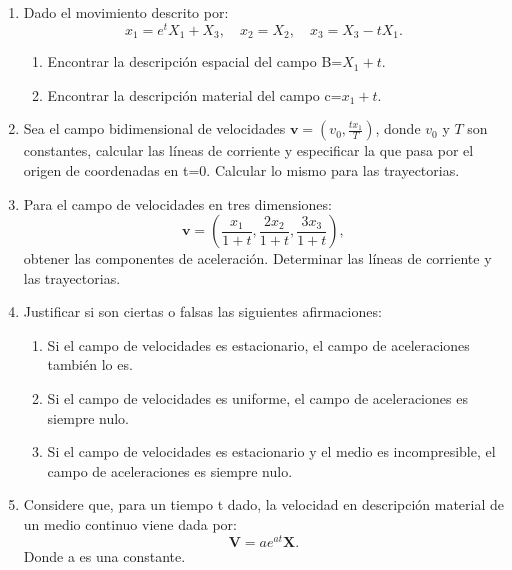 \documentclass[12pt,a4paper]{article}
\title{\mathbf{Mecánica de Medios Continuos \\Práctica 1 \\ Descripción del movimiento}}
\author{Universidad de Cuenca}
\begin{document}
\maketitle
\begin{enumerate}
    \item Dado el movimiento descrito por:
        \begin{equation}
            x_1=e^{t}X_1+X_3,\quad x_2=X_2,\quad x_3=X_3-tX_1.
        \end{equation}
        \begin{enumerate}
            \item Encontrar la descripción espacial del campo B=$X_1+t$.
            \item Encontrar la descripción material del campo c=$x_1+t$.
        \end{enumerate}
    \item Sea el campo bidimensional de velocidades $\mathbf{v}=(v_0,\frac{tx_1}{T})$, donde $v_0$ y $T$ son constantes, calcular las líneas de corriente y especificar la que pasa por el origen de coordenadas en t=0. Calcular lo mismo para las trayectorias.
    \item Para el campo de velocidades en tres dimensiones:
    \begin{equation}
        \mathbf{v}=\left(\frac{x_1}{1+t},\frac{2x_2}{1+t},\frac{3x_3}{1+t}\right),
    \end{equation}
    obtener las componentes de aceleración. Determinar las líneas de corriente y las trayectorias.
    \item Justificar si son ciertas o falsas las siguientes afirmaciones:
    \begin{enumerate}
        \item Si el campo de velocidades es estacionario, el campo de aceleraciones también lo es.
        \item Si el campo de velocidades es uniforme, el campo de aceleraciones es siempre nulo.
        \item Si el campo de velocidades es estacionario y el medio es incompresible, el campo de aceleraciones es siempre nulo.
    \end{enumerate}
    \item Considere que, para un tiempo t dado, la velocidad en descripción material de un medio continuo viene dada por:
        \begin{equation}
            \mathbf{V}=ae^{at}\mathbf{X}.
        \end{equation}
        Donde a es una constante.

\end{enumerate}
\end{document}
